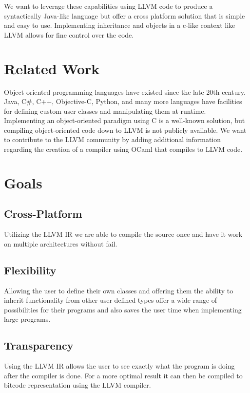 \begin{homeworkProblem}
	We want to leverage these capabilities using LLVM code to produce a syntactically Java-like language but offer a cross platform solution that is simple and easy to use. Implementing inheritance and objects in a c-like context like LLVM allows for fine control over the code. \\
	
	\section{Related Work}
	Object-oriented programming languages have existed since the late 20th century. Java, C\#, C++, Objective-C, Python, and many more languages have facilities for defining custom user classes and manipulating them at runtime. \\
	
	Implementing an object-oriented paradigm using C is a well-known solution, but compiling object-oriented code down to LLVM is not publicly available. We want to contribute to the LLVM community by adding additional information regarding the creation of a compiler using OCaml that compiles to LLVM code. 
	
	\section{Goals}
	\subsection{Cross-Platform}
	Utilizing the LLVM IR we are able to compile the source once and have it work on multiple architectures without fail.\\
	\subsection{Flexibility}
	Allowing the user to define their own classes and offering them the ability to inherit functionality from other user defined types offer a wide range of possibilities for their programs and also saves the user time when implementing large programs.\\
	\subsection{Transparency}
	Using the LLVM IR allows the user to see exactly what the program is doing after the compiler is done. For a more optimal result it can then be compiled to bitcode representation using the LLVM compiler. \\
\end{homeworkProblem}